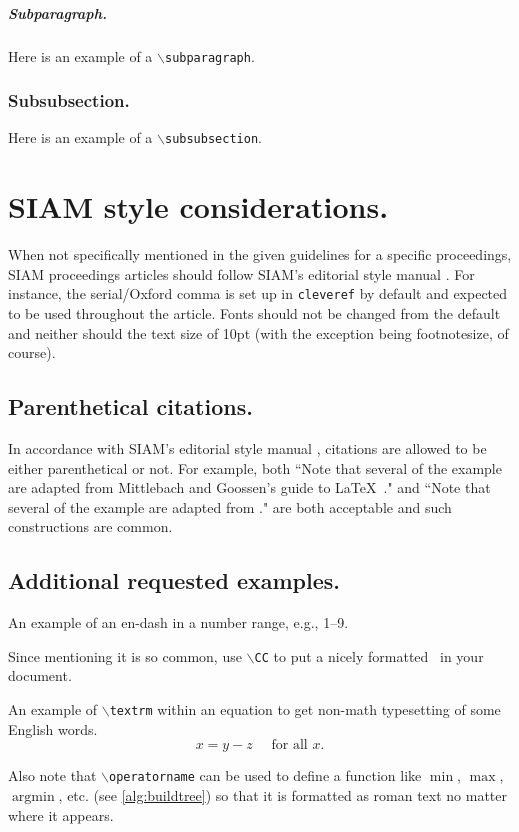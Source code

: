 \documentclass[twoside,leqno]{article}
\begin{document}
\subparagraph{Subparagraph.}
Here is an example of a $\backslash$\texttt{subparagraph}.

\subsubsection{Subsubsection.}
Here is an example of a $\backslash$\texttt{subsubsection}.

\section{SIAM style considerations.}
\label{sec:style}
When not specifically mentioned in the given guidelines for a specific proceedings, SIAM proceedings articles should follow
SIAM's editorial style manual \cite{siam}. For instance, the serial/Oxford comma is set up in \texttt{cleveref} by default
and expected to be used throughout the article. Fonts should not be changed from the default and neither should the text size
of 10pt (with the exception being footnotesize, of course).

\subsection{Parenthetical citations.}
In accordance with SIAM's editorial style manual \cite{siam}, citations are allowed to be either parenthetical or not. For 
example, both ``Note that several of the example are adapted from Mittlebach and Goossen's guide to \LaTeX~\cite{MiGo04}." 
and ``Note that several of the example are adapted from \cite{MiGo04}." are both acceptable and such constructions are common.

\subsection{Additional requested examples.}
An example of an en-dash in a number range, e.g., 1--9.

Since mentioning it is so common, use $\backslash$\texttt{CC} to put a nicely formatted \CC~in your document.

An example of $\backslash$\texttt{textrm} within an equation to get non-math typesetting of some English words. 
$$x=y-z \quad \textrm{ for all } x.$$

Also note that $\backslash$\texttt{operatorname} can be used to define a function like $\operatorname{min}$, $\operatorname{max}$, 
$\operatorname{argmin}$, etc. (see \cref{alg:buildtree}) so that it is formatted as roman text no matter where it appears.
\end{document}
